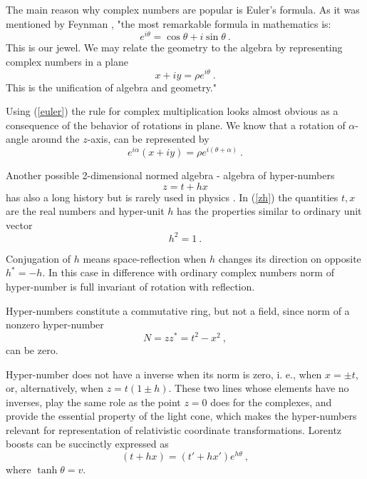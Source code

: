 \documentclass[a4paper,12pt]{article}
\begin{document}
The main reason why complex numbers are popular is Euler's formula. As it was mentioned by 
Feynman \cite{Fe}, "the most remarkable formula in mathematics is:
\begin{equation} 
e^{i\theta} = \cos{\theta} + i\sin{\theta} ~. \nonumber
\end{equation}
This is our jewel. We may relate the geometry to the algebra by representing 
complex numbers in a plane
\begin{equation} \label{euler}
x + iy = \rho e^{i\theta} ~. 
\end{equation}
This is the unification of algebra and geometry."

Using (\ref{euler}) the rule for complex multiplication looks almost obvious as a 
consequence of the behavior of rotations in plane. We know that a rotation of $\alpha$-angle 
around the $z$-axis, can be represented 
by 
\begin{equation} 
e^{i\alpha}(x + iy) = \rho e^{i(\theta + \alpha )} ~. \nonumber
\end{equation} 

Another possible 2-dimensional normed algebra - algebra of hyper-numbers 
\begin{equation} \label{zh}
z = t + hx 
\end{equation} 
has also a long history but is rarely used in physics \cite{OlAnFj}. In (\ref{zh}) the 
quantities $t, x$ are the real numbers and hyper-unit $h$ has the properties similar to 
ordinary unit vector 
\begin{equation} \label{h2}
h^2 = 1~. 
\end{equation} 

Conjugation of $h$ means space-reflection when $h$ changes its direction on opposite 
$h^* = -h$. In this case in difference with ordinary complex numbers norm of hyper-number 
is full invariant of rotation with reflection. 

Hyper-numbers constitute a commutative ring, but not a field, since norm of a nonzero
 hyper-number 
\begin{equation} \label{Nzh}
N = zz^* = t^2 - x^2 ~, 
\end{equation}
can be zero. 

Hyper-number does not have a inverse when its norm is zero, i. e., when $x = \pm t$, 
or, alternatively, when $z = t(1 \pm h)$. These two lines whose elements have no 
inverses, play the same role as the point $z = 0$ does for the complexes, and provide 
the essential property of the light cone, which makes the hyper-numbers relevant for 
representation of relativistic coordinate transformations. Lorentz boosts can be 
succinctly expressed as 
\begin{equation} \label{lorentz}
(t + hx) = (t' + hx')e^{h\theta}~,
\end{equation}
where $\tanh{\theta} = v$.
\end{document}
